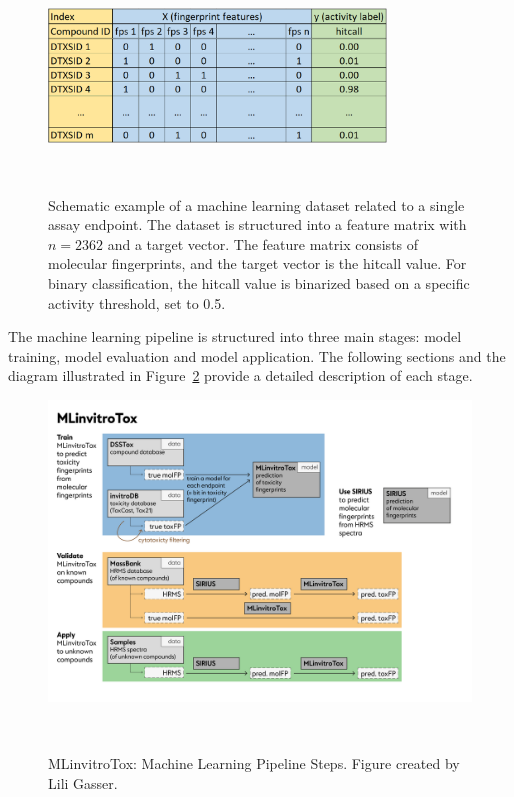 \begin{figure}[h]
    \centering
    \includegraphics[width=0.8\textwidth]{figures/ml_dataset.png}
    \caption{Schematic example of a machine learning dataset related to a single assay endpoint. The dataset is structured into a feature matrix with $n=2362$ and a target vector. The feature matrix consists of molecular fingerprints, and the target vector is the hitcall value. For binary classification, the hitcall value is binarized based on a specific activity threshold, set to 0.5.}
~\label{fig:ml_dataset}
\end{figure}


The machine learning pipeline is structured into three main stages: model training, model evaluation and model application. The following sections and the diagram illustrated in Figure~\ref{fig:Project_overview} provide a detailed description of each stage.

\begin{figure}[h]
    \centering
    \includegraphics[width=1.0\textwidth]{figures/Project_overview.png}
    \caption{MLinvitroTox: Machine Learning Pipeline Steps. Figure created by Lili Gasser.}
~\label{fig:Project_overview}
\end{figure}

